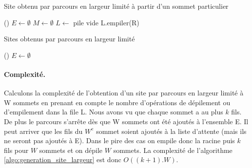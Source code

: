 \begin{algorithm}[h]
\DontPrintSemicolon
\caption{Site obtenu par parcours en largeur limité à partir d'un sommet particulier}
\SetAlgoLined
{}
\Fn(){}{
$E\leftarrow \emptyset$  
$M\leftarrow \emptyset$  
$L\leftarrow$ pile vide  
L.empiler(R)             \\
{
}
}
\label{algo:generation_site_largeur}
\end{algorithm}

\begin{algorithm}[h]
\DontPrintSemicolon
\caption{Sites obtenus par parcours en largeur limité}
\SetAlgoLined
{}
\Fn(){}{
$E\leftarrow\emptyset$\\
}
\label{algo:generation_sites_largeur}
\end{algorithm}

\paragraph{Complexité.}
Calculons la complexité de l'obtention d'un site par parcours en largeur limité à W sommets en prenant en compte le nombre d'opérations de dépilement ou d'empilement dans la file L.
Nous avons vu que chaque sommet a au plus $k$ fils.
De plus le parcours s'arrête dès que W sommets ont été ajoutés à l'ensemble E. Il peut arriver que les fils du $W^e$ sommet soient ajoutés à la liste d'attente (mais ils ne seront pas ajoutés à E).
Dans le pire des cas on empile donc la racine puis $k$ fils pour $W$ sommets et on dépile $W$ sommets. La complexité de l'algorithme \ref{algo:generation_site_largeur} est donc $O((k+1).W)$.

